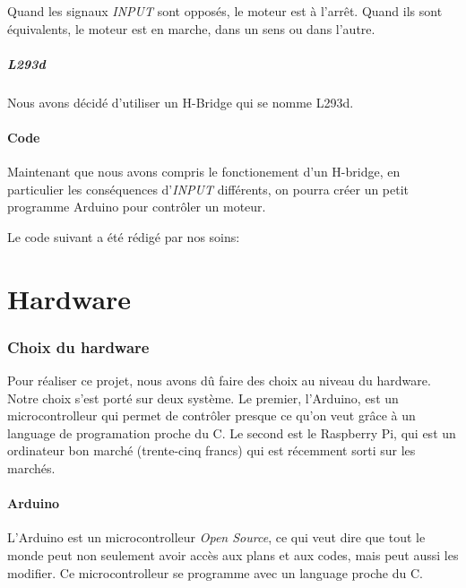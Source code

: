 \documentclass[a4paper,12pt]{article}
\begin{document}
{\begin{table}
\caption{\label{tableDeVerite} Table de v\'erit\'e accompagnant le sch\'ema du
H-bridge (fig.(\ref{H-bridge}))}

\small Quand les signaux \emph{INPUT} sont oppos\'es, le moteur est \`a
l'arr\^et. Quand ils sont \'equivalents, le moteur est en marche, dans un sens
ou dans l'autre.\normalsize
\end{table}

\subsubsection{L293d}
Nous avons décidé d'utiliser un H-Bridge qui se nomme L293d.

\subsection{Code}

Maintenant que nous avons compris le fonctionement d'un H-bridge, en
particulier les cons\'equences d'\emph{INPUT} diff\'erents, on pourra cr\'eer
un petit programme Arduino pour contr\^oler un moteur.

Le code suivant a \'et\'e r\'edig\'e par nos soins:





\part{Hardware}

\section{Choix du hardware}
Pour réaliser ce projet, nous avons dû faire des choix au niveau du hardware. Notre choix s'est porté sur deux système. Le premier, l'Arduino, est un microcontrolleur qui permet de contrôler presque ce qu'on veut grâce à un language de programation proche du C. Le second est le Raspberry Pi, qui est un ordinateur bon marché (trente-cinq francs) qui est récemment sorti sur les marchés. 


\subsection{Arduino}
L'Arduino \cite{Arduino} est un microcontrolleur \textit{Open Source}, ce qui veut dire que tout le monde peut non seulement avoir accès aux plans et aux codes, mais peut aussi les modifier. Ce microcontrolleur se programme avec un language proche du C. 


}
\end{document}
